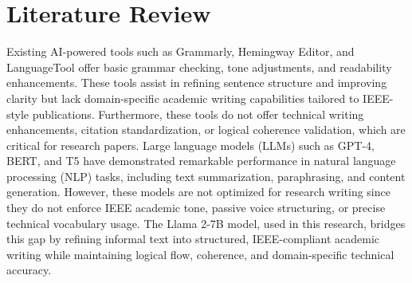\documentclass[conference]{IEEEtran}
\begin{document}
  \section{Literature Review}
  Existing AI-powered tools such as Grammarly, Hemingway Editor, and LanguageTool offer basic grammar checking, tone adjustments, and readability enhancements. These tools assist in refining sentence structure and improving clarity but lack domain-specific academic writing capabilities tailored to IEEE-style publications. Furthermore, these tools do not offer technical writing enhancements, citation standardization, or logical coherence validation, which are critical for research papers.
Large language models (LLMs) such as GPT-4, BERT, and T5 have demonstrated remarkable performance in natural language processing (NLP) tasks, including text summarization, paraphrasing, and content generation. However, these models are not optimized for research writing since they do not enforce IEEE academic tone, passive voice structuring, or precise technical vocabulary usage. The Llama 2-7B model, used in this research, bridges this gap by refining informal text into structured, IEEE-compliant academic writing while maintaining logical flow, coherence, and domain-specific technical accuracy.
\end{document}
